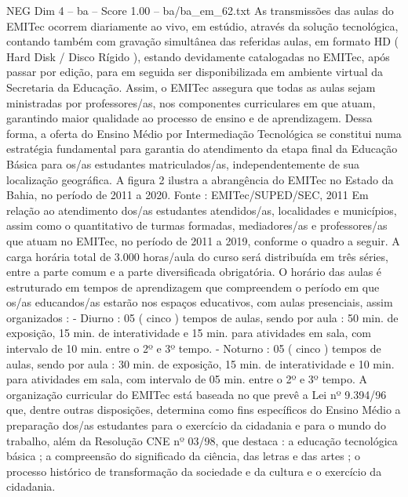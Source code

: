 \begin{textsample}{NEG Dim 4 – ba – Score 1.00 – ba/ba\_em\_62.txt}
As transmissões das aulas do EMITec ocorrem diariamente ao vivo, em estúdio, através da solução tecnológica, contando também com gravação simultânea das referidas aulas, em formato HD ( Hard Disk / Disco Rígido ), estando devidamente catalogadas no EMITec, após passar por edição, para em seguida ser disponibilizada em ambiente virtual da Secretaria da Educação.
Assim, o EMITec assegura que todas as aulas sejam ministradas por professores/as, nos componentes curriculares em que atuam, garantindo maior qualidade ao processo de ensino e de aprendizagem.
Dessa forma, a oferta do Ensino Médio por Intermediação Tecnológica se constitui numa estratégia fundamental para garantia do atendimento da etapa final da Educação Básica para os/as estudantes matriculados/as, independentemente de sua localização geográfica.
A figura 2 ilustra a abrangência do EMITec no Estado da Bahia, no período de 2011 a 2020.
Fonte : EMITec/SUPED/SEC, 2011 Em relação ao atendimento dos/as estudantes atendidos/as, localidades e municípios, assim como o quantitativo de turmas formadas, mediadores/as e professores/as que atuam no EMITec, no período de 2011 a 2019, conforme o quadro a seguir.
A carga horária total de 3.000 horas/aula do curso será distribuída em três séries, entre a parte comum e a parte diversificada obrigatória.
O horário das aulas é estruturado em tempos de aprendizagem que compreendem o período em que os/as educandos/as estarão nos espaços educativos, com aulas presenciais, assim organizados : - Diurno : 05 ( cinco ) tempos de aulas, sendo por aula : 50 min. de exposição, 15 min. de interatividade e 15 min. para atividades em sala, com intervalo de 10 min. entre o 2º e 3º tempo. - Noturno : 05 ( cinco ) tempos de aulas, sendo por aula : 30 min. de exposição, 15 min. de interatividade e 10 min. para atividades em sala, com intervalo de 05 min. entre o 2º e 3º tempo.
A organização curricular do EMITec está baseada no que prevê a Lei nº 9.394/96 que, dentre outras disposições, determina como fins específicos do Ensino Médio a preparação dos/as estudantes para o exercício da cidadania e para o mundo do trabalho, além da Resolução CNE nº 03/98, que destaca : a educação tecnológica básica ; a compreensão do significado da ciência, das letras e das artes ; o processo histórico de transformação da sociedade e da cultura e o exercício da cidadania.

\end{textsample}
